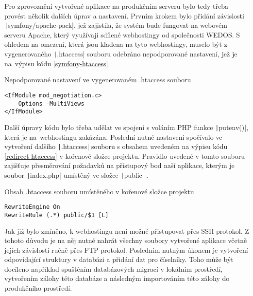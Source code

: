 Pro zprovoznění vytvořené aplikace na produkčním serveru bylo tedy třeba provést několik dalších úprav a nastavení. Prvním krokem bylo přidání závislosti \texttt|symfony/apache-pack|, jež zajistila, že systém bude fungovat na webovém serveru Apache, který využívají sdílené webhostingy od společnosti WEDOS. S ohledem na omezení, která jsou kladena na tyto webhostingy, muselo být z vygenerovaného \texttt|.htaccess| souboru odebráno nepodporované nastavení, jež je na~výpisu kódu \ref{symfony-htaccess}. \cite{symfony_wedos}

\begin{listing}[h]
    \caption{Nepodporované nastavení ve vygenerovaném .htaccess souboru}\label{symfony-htaccess}
    \begin{verbatim}
<IfModule mod_negotiation.c>
    Options -MultiViews
</IfModule>
    \end{verbatim}
\end{listing}

Další úpravy kódu bylo třeba udělat ve spojení s voláním PHP funkce \texttt|putenv()|, která je na~webhostingu zakázána. Poslední nutné nastavení spočívalo ve vytvoření dalšího \texttt|.htaccess| souboru s obsahem uvedeném na výpisu kódu \ref{redirect-htaccess} v kořenové složce projektu. Pravidlo uvedené v tomto souboru zajišťuje přesměrování požadavků na přístupový bod naší aplikace, kterým je soubor \texttt|index.php| umístěný ve složce \texttt|public| \cite{symfony_wedos}.

\begin{listing}[h]
    \caption{Obsah .htaccess souboru umístěného v kořenové složce projektu}\label{redirect-htaccess}
    \begin{verbatim}
RewriteEngine On
RewriteRule (.*) public/$1 [L]
    \end{verbatim}
\end{listing}

Jak již bylo zmíněno, k webhostingu není možné přistupovat přes SSH protokol. Z tohoto důvodu je na něj nutné nahrát všechny soubory vytvořené aplikace včetně jejích závislostí ručně přes FTP protokol. Posledním nutným úkonem je vytvoření odpovídající struktury v databázi a přidání dat pro číselníky. Toho může být docíleno například spuštěním databázových migrací v lokálním prostředí, vytvořením zálohy této databáze a následným importováním této zálohy do produkčního prostředí.
